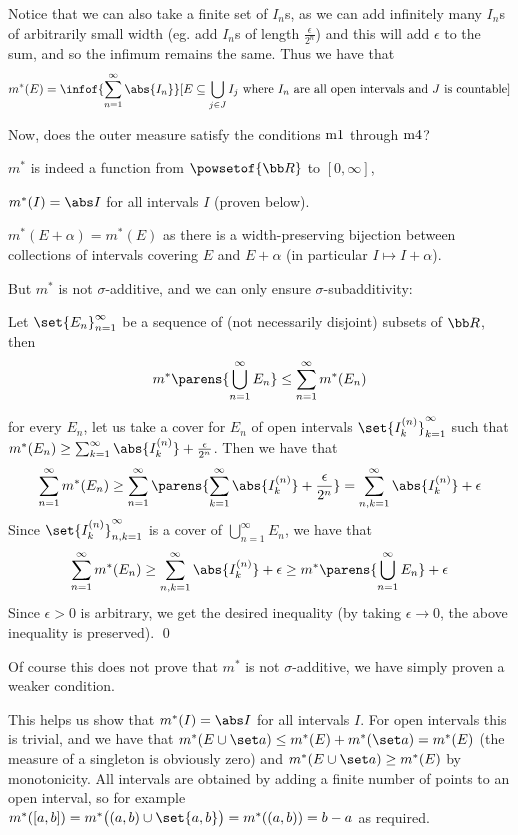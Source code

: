 Notice that we can also take a finite set of $I_n$s, as we can add infinitely many $I_n$s of arbitrarily small width (eg. add $I_n$s of length $\frac\epsilon{2^n}$) and this will add $\epsilon$ to the
sum, and so the infimum remains the same.
Thus we have that
$$ m^*(E) = \infof{\sum_{n=1}^\infty\abs{I_n}}[E\subseteq\bigcup_{j\in J}I_j\hbox{ where $I_n$ are all open intervals and $J$ is countable}] $$

Now, does the outer measure satisfy the conditions $\rm m1$ through $\rm m4$?
\benum
    \item $m^*$ is indeed a function from $\powsetof{\bb R}$ to $[0,\infty]$,
    \item $m^*(I)=\abs I$ for all intervals $I$ (proven below).
    \item $m^*(E+\alpha)=m^*(E)$ as there is a width-preserving bijection between collections of intervals covering $E$ and $E+\alpha$ (in particular $I\mapsto I+\alpha$).
\eenum

But $m^*$ is not $\sigma$-additive, and we can only ensure $\sigma$-subadditivity:

\bthrm

    Let $\set{E_n}_{n=1}^\infty$ be a sequence of (not necessarily disjoint) subsets of ${\bb R}$, then
    $$ m^*\parens{\bigcup_{n=1}^\infty E_n} \leq \sum_{n=1}^\infty m^*(E_n) $$

\ethrm

\Proof for every $E_n$, let us take a cover for $E_n$ of open intervals $\set{I_k^{(n)}}_{k=1}^\infty$ such that $m^*(E_n)\geq\sum_{k=1}^\infty\abs{I_k^{(n)}}+\frac\epsilon{2^n}$.
Then we have that
$$ \sum_{n=1}^\infty m^*(E_n) \geq \sum_{n=1}^\infty\parens{\sum_{k=1}^\infty\abs{I_k^{(n)}}+\frac\epsilon{2^n}} = \sum_{n,k=1}^\infty\abs{I_k^{(n)}}+\epsilon $$
Since $\set{I_k^{(n)}}_{n,k=1}^\infty$ is a cover of $\bigcup_{n=1}^\infty E_n$, we have that
$$ \sum_{n=1}^\infty m^*(E_n) \geq \sum_{n,k=1}^\infty\abs{I_k^{(n)}}+\epsilon \geq m^*\parens{\bigcup_{n=1}^\infty E_n}+\epsilon $$
Since $\epsilon>0$ is arbitrary, we get the desired inequality (by taking $\epsilon\to0$, the above inequality is preserved).
\qed

Of course this does not prove that $m^*$ is not $\sigma$-additive, we have simply proven a weaker condition.

This helps us show that $m^*(I)=\abs I$ for all intervals $I$.
For open intervals this is trivial, and we have that $m^*(E\cup\set a)\leq m^*(E)+m^*(\set a)=m^*(E)$ (the measure of a singleton is obviously zero) and $m^*(E\cup\set a)\geq m^*(E)$ by monotonicity.
All intervals are obtained by adding a finite number of points to an open interval, so for example $m^*([a,b])=m^*\bigl((a,b)\cup\set{a,b}\bigr)=m^*((a,b))=b-a$ as required.


